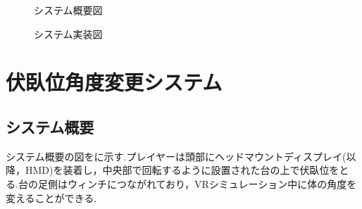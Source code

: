\documentclass[uplatex]{jsarticle}
\begin{document}
 \begin{figure}[tb]
  \centering
  \caption{システム概要図}
  \label{fig:about_system}

  \centering
  \caption{システム実装図}
  \label{fig:build_system}

\end{figure}

\section{伏臥位角度変更システム}
\subsection{システム概要}
システム概要の図をに示す.プレイヤーは頭部にヘッドマウントディスプレイ(以降，HMD)を装着し，中央部で回転するように設置された台の上で伏臥位をとる.台の足側はウィンチにつながれており，VRシミュレーション中に体の角度を変えることができる.
\end{document}
